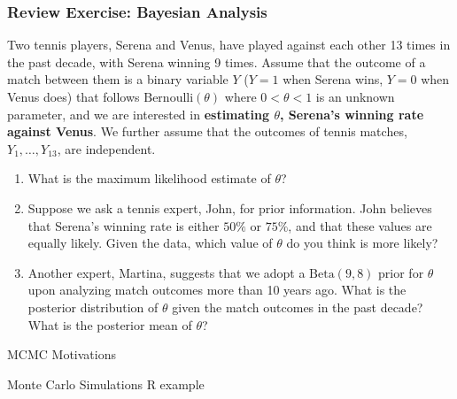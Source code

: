 \documentclass{beamer}
\begin{document}
\begin{frame}
\frametitle{Review Exercise: Bayesian Analysis}
Two tennis players, Serena and Venus, have played against each other 13 times in the past decade, with Serena winning 9 times. Assume that the outcome of a match between them is a binary variable $Y$ ($Y=1$ when Serena wins, $Y=0$ when Venus does) that follows $\text{Bernoulli}(\theta)$ where $0 < \theta < 1$ is an unknown parameter, and we are interested in \textbf{estimating $\theta$, Serena's winning rate against Venus}. We further assume that the outcomes of tennis matches, $Y_1,\ldots,Y_{13}$, are independent.
\begin{enumerate}
\item What is the maximum likelihood estimate of $\theta$?
\item Suppose we ask a tennis expert, John, for prior information. John believes that Serena's winning rate is either $50\%$ or $75\%$, and that these values are equally likely. Given the data, which value of $\theta$ do you think is more likely?
\item Another expert, Martina, suggests that we adopt a $\text{Beta}(9,8)$ prior for $\theta$ %
upon analyzing match outcomes more than 10 years ago.
What is the posterior distribution of $\theta$ given the match outcomes in the past decade? What is the posterior mean of $\theta$?
\end{enumerate}
\end{frame}

\begin{frame}{MCMC}
Motivations

\end{frame}

\begin{frame}{Monte Carlo Simulations}
R example

\end{frame}
\end{document}
